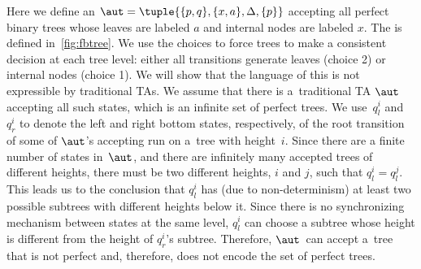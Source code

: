 Here we define an \lsta $\aut=\tuple{\{p,q\}, \{x,a\}, \Delta, \{p\}}$ accepting all perfect
%
binary trees whose leaves are labeled $a$ and internal nodes are
  labeled $x$. The \lsta is defined
  in~\cref{fig:fbtree}. We use the choices to force trees to
  make a consistent decision at each tree level: either all transitions generate
  leaves (choice 2) or internal nodes (choice 1). 
  We will show that the language of this \lsta is not expressible by traditional TAs. 
We assume that there is a~traditional TA $\aut$ accepting all such states, which is an infinite set of perfect trees. 
We use~$q^i_l$ and $q^i_r$ to denote the left and right bottom states, respectively, of the root transition of
some of $\aut$'s accepting run on a~tree with height~$i$.
Since there are a finite number of states in~$\aut$, and there are infinitely many accepted trees of different heights, there must be two different heights, $i$ and $j$, such that $q^i_l=q^j_l$. 
This leads us to the conclusion that $q^i_l$ has (due to non-determinism) at least two possible subtrees with different heights below it.
Since there is no synchronizing mechanism between states at the same level, $q^i_l$ can choose a subtree whose height is different from the height of
$q^i_r$'s subtree. Therefore, $\aut$~can accept a~tree that is not perfect and, therefore, does not encode the set of perfect trees. 



